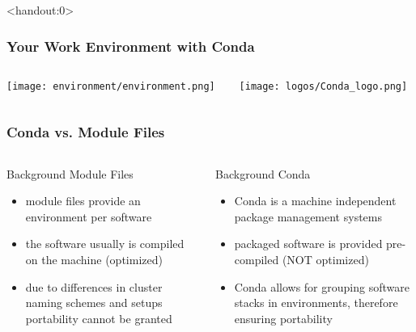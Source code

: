 \begin{frame}<handout:0> 
  \frametitle{Your Work Environment with Conda}
  \begin{columns}
    \begin{column}{0.5\textwidth}\centering
      \texttt{[image: environment/environment.png]}
    \end{column}
    \begin{column}{0.5\textwidth}\centering
      \texttt{[image: logos/Conda\_logo.png]}   
    \end{column}
  \end{columns}
\end{frame}

\begin{frame}
  \frametitle{Conda vs. Module Files}
  \begin{columns}
    \begin{column}{0.5\textwidth}
      Background Module Files
      \begin{itemize}
       \item module files provide an environment per software
       \item the software usually is compiled on the machine (optimized)
       \item due to differences in cluster naming schemes and setups portability cannot be granted
      \end{itemize}
    \end{column}
    \begin{column}{0.5\textwidth}
      Background Conda
      \begin{itemize}
       \item Conda is a machine independent package management systems
       \item packaged software is provided pre-compiled (NOT optimized)
       \item Conda allows for grouping software stacks in environments, therefore ensuring portability
      \end{itemize}
    \end{column}
  \end{columns}
\end{frame}



